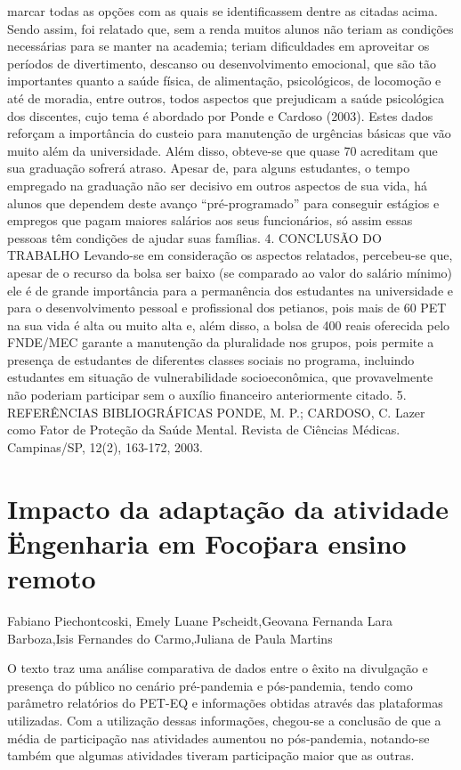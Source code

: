 marcar todas as opções com as quais se identificassem dentre as citadas acima.
Sendo assim, foi relatado que, sem a renda muitos alunos não teriam as condições
necessárias para se manter na academia; teriam dificuldades em aproveitar os períodos de
divertimento, descanso ou desenvolvimento emocional, que são tão importantes quanto a saúde
física, de alimentação, psicológicos, de locomoção e até de moradia, entre outros, todos aspectos
que prejudicam a saúde psicológica dos discentes, cujo tema é abordado por Ponde e Cardoso
(2003).
Estes dados reforçam a importância do custeio para manutenção de urgências básicas que
vão muito além da universidade. Além disso, obteve-se que quase 70%
acreditam que sua graduação sofrerá atraso. Apesar de, para alguns estudantes, o tempo
empregado na graduação não ser decisivo em outros aspectos de sua vida, há alunos que
dependem deste avanço “pré-programado” para conseguir estágios e empregos que pagam
maiores salários aos seus funcionários, só assim essas pessoas têm condições de ajudar suas
famílias.
4. CONCLUSÃO DO TRABALHO
Levando-se em consideração os aspectos relatados, percebeu-se que, apesar de o recurso
da bolsa ser baixo (se comparado ao valor do salário mínimo) ele é de grande importância para a
permanência dos estudantes na universidade e para o desenvolvimento pessoal e profissional dos
petianos, pois mais de 60%
PET na sua vida é alta ou muito alta e, além disso, a bolsa de 400 reais oferecida pelo
FNDE/MEC garante a manutenção da pluralidade nos grupos, pois permite a presença de
estudantes de diferentes classes sociais no programa, incluindo estudantes em situação de
vulnerabilidade socioeconômica, que provavelmente não poderiam participar sem o auxílio
financeiro anteriormente citado.
5. REFERÊNCIAS BIBLIOGRÁFICAS
PONDE, M. P.; CARDOSO, C. Lazer como Fator de Proteção da Saúde Mental. Revista de
Ciências Médicas. Campinas/SP, 12(2), 163-172, 2003.



\section{Impacto da adaptação da atividade \"Engenharia em Foco\" para ensino remoto}

Fabiano Piechontcoski, Emely Luane Pscheidt,Geovana Fernanda Lara Barboza,Isis Fernandes do Carmo,Juliana de Paula Martins

O texto traz uma análise comparativa de dados entre o êxito na divulgação e presença do público no cenário pré-pandemia e pós-pandemia, tendo como parâmetro relatórios do PET-EQ e informações obtidas através das plataformas utilizadas. Com a utilização dessas informações, chegou-se a conclusão de que a média de participação nas atividades aumentou no pós-pandemia, notando-se também que algumas atividades tiveram participação maior que as outras.

